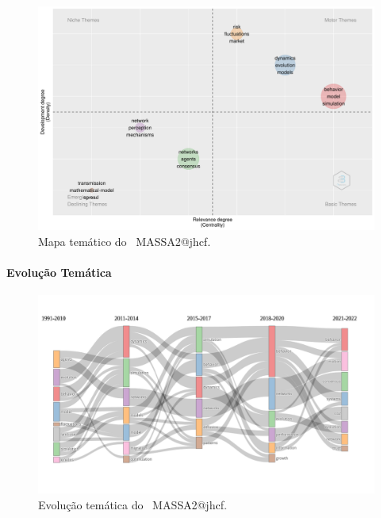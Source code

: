 \begin{figure}
    \centering
    \includegraphics[width=1\textwidth]{exploratory-data-analysis/jhcf/PesqBibliogr/SimulacaoMultiagente/WoS-20220203/Estrutura/Conceitual/MASSA2-ThematicMap.png}
    \caption{Mapa temático do  \dataset\ MASSA2@jhcf.}
    \label{fig:MASSA2-ThematicMap}
\end{figure}

\paragraph{Evolução Temática}

\begin{figure}
    \centering
    \includegraphics[width=1\textwidth]{exploratory-data-analysis/jhcf/PesqBibliogr/SimulacaoMultiagente/WoS-20220203/Estrutura/Conceitual/MASSA2-Thematic-Evolution.png}
    \caption{Evolução temática do  \dataset\ MASSA2@jhcf.}
    \label{fig:MASSA2-Thematic-Evolution}
\end{figure}

